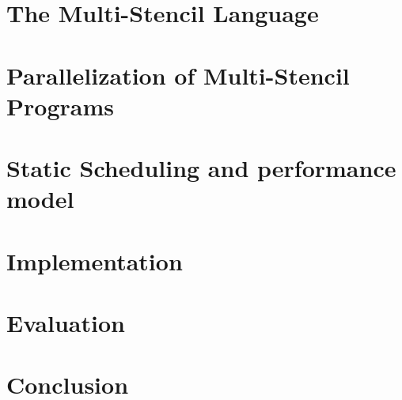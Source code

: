 \documentclass[smallextended]{svjour3}       %
\begin{document}
\section{The Multi-Stencil Language}
\label{sect:msl}

\section{Parallelization of Multi-Stencil Programs}
\label{sect:parallelism}

\section{Static Scheduling and performance model}
\label{sect:msp}

\section{Implementation}
\label{sect:comp}

\section{Evaluation}
\label{sect:eval}

\section{Conclusion}
\label{sect:concl}





\end{document}
